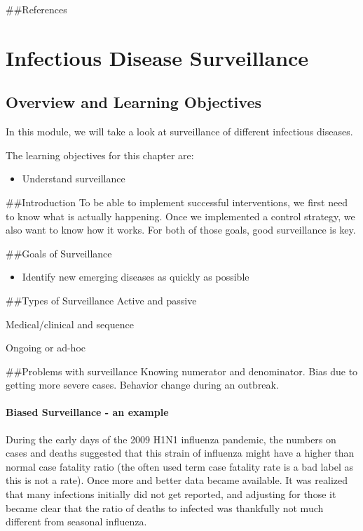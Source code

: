 \documentclass[]{book}
\providecommand{\tightlist}{%
  \setlength{\itemsep}{0pt}\setlength{\parskip}{0pt}}
\theoremstyle{definition}
\theoremstyle{definition}
\theoremstyle{definition}
\theoremstyle{remark}
\begin{document}
\#\#References

\hypertarget{infectious-disease-surveillance}{%
\chapter{Infectious Disease
Surveillance}\label{infectious-disease-surveillance}}

\hypertarget{overview-and-learning-objectives-9}{%
\section{Overview and Learning
Objectives}\label{overview-and-learning-objectives-9}}

In this module, we will take a look at surveillance of different
infectious diseases.

The learning objectives for this chapter are:

\begin{itemize}
\tightlist
\item
  Understand surveillance
\end{itemize}

\#\#Introduction To be able to implement successful interventions, we
first need to know what is actually happening. Once we implemented a
control strategy, we also want to know how it works. For both of those
goals, good surveillance is key.

\#\#Goals of Surveillance

\begin{itemize}
\tightlist
\item
  Identify new emerging diseases as quickly as possible
\end{itemize}

\#\#Types of Surveillance Active and passive

Medical/clinical and sequence

Ongoing or ad-hoc

\#\#Problems with surveillance Knowing numerator and denominator. Bias
due to getting more severe cases. Behavior change during an outbreak.

\hypertarget{myexamplebox}{%
\subsubsection{Biased Surveillance - an example}\label{myexamplebox}}

During the early days of the 2009 H1N1 influenza pandemic, the numbers
on cases and deaths suggested that this strain of influenza might have a
higher than normal case fatality ratio (the often used term case
fatality rate is a bad label as this is not a rate). Once more and
better data became available. It was realized that many infections
initially did not get reported, and adjusting for those it became clear
that the ratio of deaths to infected was thankfully not much different
from seasonal influenza.
\end{document}
